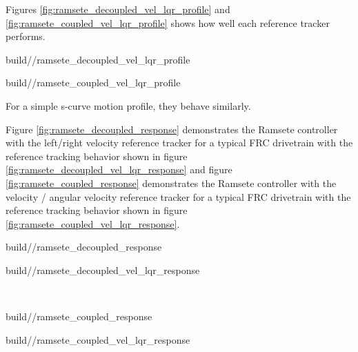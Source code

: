 Figures \ref{fig:ramsete_decoupled_vel_lqr_profile} and
\ref{fig:ramsete_coupled_vel_lqr_profile} shows how well each \gls{reference}
tracker performs.
\begin{bookfigure}
  \begin{minisvg}{2}{build/\chapterpath/ramsete_decoupled_vel_lqr_profile}
    \caption{Left/right velocity reference tracker response to a motion profile}
    \label{fig:ramsete_decoupled_vel_lqr_profile}
  \end{minisvg}
  \hfill
  \begin{minisvg}{2}{build/\chapterpath/ramsete_coupled_vel_lqr_profile}
    \caption{Linear/angular velocity reference tracker response to a motion
      profile}
    \label{fig:ramsete_coupled_vel_lqr_profile}
  \end{minisvg}
\end{bookfigure}

For a simple s-curve motion profile, they behave similarly.

Figure \ref{fig:ramsete_decoupled_response} demonstrates the Ramsete controller
with the left/right velocity \gls{reference} tracker for a typical FRC
drivetrain with the \gls{reference} tracking behavior shown in figure
\ref{fig:ramsete_decoupled_vel_lqr_response} and figure
\ref{fig:ramsete_coupled_response} demonstrates the Ramsete controller with the
velocity / angular velocity \gls{reference} tracker for a typical FRC drivetrain
with the \gls{reference} tracking behavior shown in figure
\ref{fig:ramsete_coupled_vel_lqr_response}.
\begin{bookfigure}
  \begin{minisvg}{2}{build/\chapterpath/ramsete_decoupled_response}
    \caption{Ramsete controller response with left/right velocity reference
      tracker ($b = 2$, $\zeta = 0.7$)}
    \label{fig:ramsete_decoupled_response}
  \end{minisvg}
  \hfill
  \begin{minisvg}{2}{build/\chapterpath/ramsete_decoupled_vel_lqr_response}
    \caption{Ramsete controller's left/right velocity reference tracker
      response}
    \label{fig:ramsete_decoupled_vel_lqr_response}
  \end{minisvg} \\
  \begin{minisvg}{2}{build/\chapterpath/ramsete_coupled_response}
    \caption{Ramsete controller response with velocity / angular velocity
      reference tracker ($b = 2$, $\zeta = 0.7$)}
    \label{fig:ramsete_coupled_response}
  \end{minisvg}
  \hfill
  \begin{minisvg}{2}{build/\chapterpath/ramsete_coupled_vel_lqr_response}
    \caption{Ramsete controller's velocity / angular velocity reference tracker
      response}
    \label{fig:ramsete_coupled_vel_lqr_response}
  \end{minisvg}
\end{bookfigure}

